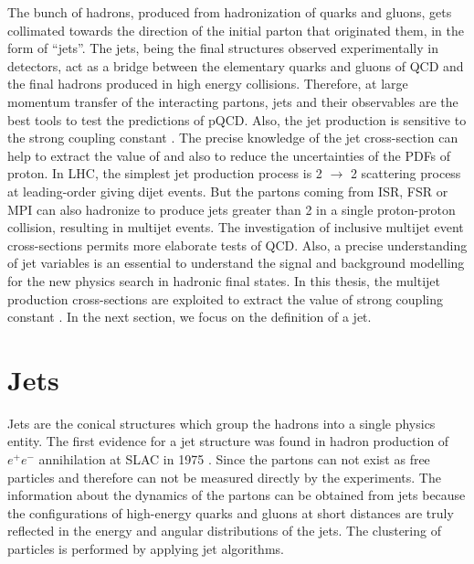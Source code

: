 The bunch of hadrons, produced from hadronization of quarks and gluons, gets collimated towards the direction of the initial parton that originated them, in the form of ``jets''. The jets, being the final structures observed experimentally in detectors, act as a bridge between the elementary quarks and gluons of QCD and the final hadrons produced in high energy collisions. Therefore, at large momentum transfer of the interacting partons, jets and their observables are the best tools to test the predictions of pQCD. Also, the jet production is sensitive to the strong coupling constant \alpsns. The precise knowledge of the jet cross-section can help to extract the value of \alps and also to reduce the uncertainties of the PDFs of proton. In LHC, the simplest jet production process is 2 $\rightarrow$ 2 scattering process at leading-order giving dijet events. But the partons coming from ISR, FSR or MPI can also hadronize to produce jets greater than 2 in a single proton-proton collision, resulting in multijet events. The investigation of inclusive multijet event cross-sections permits more elaborate tests of QCD. Also, a precise understanding of jet variables is an essential to understand the signal and background modelling for the new physics search in hadronic final states. In this thesis, the multijet production cross-sections are exploited to extract the value of strong coupling constant \alps. In the next section, we focus on the definition of a jet.
\section{Jets}
\label{sec:jets}
Jets \cite{Sterman:1977wj} are the conical structures which group the hadrons into a single physics entity. The first evidence for a jet structure was found in hadron production of $e^\plus e^-$ annihilation at SLAC in 1975 \cite{Hanson:1975fe}. Since the partons can not exist as free particles and therefore can not be measured directly by the experiments. The information about the dynamics of the partons can be obtained from jets because the configurations of high-energy quarks and gluons at short distances are truly reflected in the energy and angular distributions of the jets. The clustering of particles is performed by applying jet algorithms.

